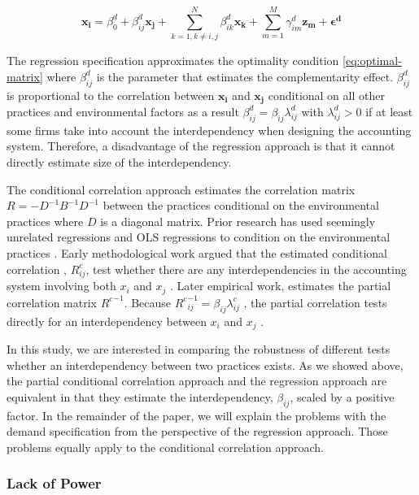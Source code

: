 \documentclass[12pt]{article}
\begin{document}
\begin{equation} \label{eq:demand-specification}
\mathbf{x_i} = \beta_0^d + \beta_{ij}^d \mathbf{x_j} 
		+ \sum_{k = 1, k \neq i,j}^N \beta_{ik}^d \mathbf{x_k} 
        + \sum_{m = 1}^M \gamma_{im}^d \mathbf{z_m}
        + \mathbf{\epsilon^d}
\end{equation}

The regression specification approximates the optimality condition  \eqref{eq:optimal-matrix} where \(\beta^d_{ij}\) is the parameter that estimates the complementarity effect. $\beta_{ij}^d$ is proportional to the  correlation between $\mathbf{x_i}$ and $\mathbf{x_j}$ conditional on all other practices and environmental factors as a result  $\beta^d_{ij} = \beta_{ij} \lambda^d_{ij}$ with $\lambda^d_{ij} > 0$ if at least some firms take into account the interdependency when designing the accounting system. Therefore, a disadvantage of the regression approach is that it cannot directly estimate size of the interdependency.

The conditional correlation approach estimates the correlation matrix $R = -D^{-1}B^{-1}D^{-1}$ between the practices  conditional on the environmental practices where $D$ is a diagonal matrix. Prior research has used seemingly unrelated regressions and OLS regressions to condition on the environmental practices \citep{Indjejikian2012, Matejka2017BalancingEvidence}. Early methodological work argued that the estimated conditional correlation , $R^c_{ij}$, test whether there are any interdependencies in the accounting system involving both $x_i$ and $x_j$ \citep{Arora1996}.  Later empirical work, estimates the partial correlation matrix ${R^c}^{-1}$. Because ${R^c}^{-1}_{ij} = \beta_{ij} \lambda^c_{ij}$ , the partial correlation tests directly for an interdependency between $x_i$ and $x_j$ \citep{Indjejikian2012}. 

In this study, we are interested in comparing the robustness of different tests whether an interdependency between two practices exists. As we showed above, the partial conditional correlation approach and the regression approach are equivalent in that they estimate the interdependency, $\beta_{ij}$, scaled by a positive factor. In the remainder of the paper, we will explain the problems with the demand specification from the perspective of the regression approach. Those problems equally apply to the conditional correlation approach.  

\subsubsection{Lack of Power}
\end{document}
